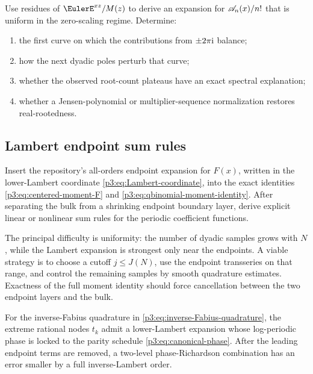 \documentclass[11pt,oneside]{article}
\numberwithin{equation}{section}
\theoremstyle{definition}
\theoremstyle{remark}
\begin{document}
\begin{problem}
\label{p3:prob:Appell-spectral-asymptotic}
Use residues of $\EulerE^{xz}/M(z)$ to derive an expansion for $\mathscr A_n(x)/n!$ that is uniform in the zero-scaling regime.  Determine:
\begin{enumerate}
\item the first curve on which the contributions from $\pm2\pi\mathrm i$ balance;
\item how the next dyadic poles perturb that curve;
\item whether the observed root-count plateaus have an exact spectral explanation;
\item whether a Jensen-polynomial or multiplier-sequence normalization restores real-rootedness.
\end{enumerate}
\end{problem}

\subsection{Lambert endpoint sum rules}

\begin{problem}
\label{p3:prob:Lambert-sum-rules}
Insert the repository's all-orders endpoint expansion for $F(x)$, written in the lower-Lambert coordinate \eqref{p3:eq:Lambert-coordinate}, into the exact identities \eqref{p3:eq:centered-moment-F} and \eqref{p3:eq:qbinomial-moment-identity}.  After separating the bulk from a shrinking endpoint boundary layer, derive explicit linear or nonlinear sum rules for the periodic coefficient functions.
\end{problem}

The principal difficulty is uniformity: the number of dyadic samples grows with $N$, while the Lambert expansion is strongest only near the endpoints.  A viable strategy is to choose a cutoff $j\le J(N)$, use the endpoint transseries on that range, and control the remaining samples by smooth quadrature estimates.  Exactness of the full moment identity should force cancellation between the two endpoint layers and the bulk.

\begin{conjecture}
\label{p3:conj:quantile-phase-locking}
For the inverse-Fabius quadrature in \eqref{p3:eq:inverse-Fabius-quadrature}, the extreme rational nodes $t_k$ admit a lower-Lambert expansion whose log-periodic phase is locked to the parity schedule \eqref{p3:eq:canonical-phase}.  After the leading endpoint terms are removed, a two-level phase-Richardson combination has an error smaller by a full inverse-Lambert order.
\end{conjecture}
\end{document}
